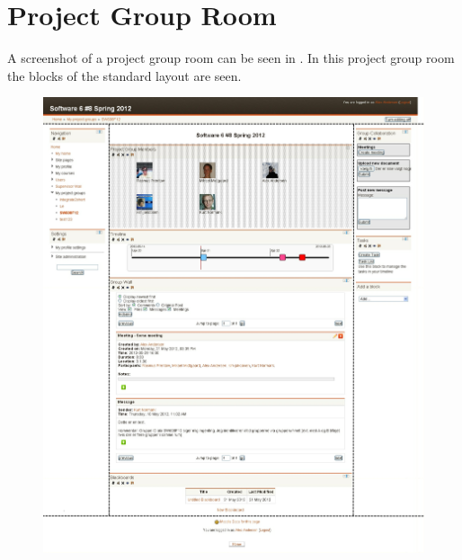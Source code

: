 \section{Project Group Room}
A screenshot of a project group room can be seen in . 
In this project group room the blocks of the standard layout are seen.
\begin{figure}[h]
	\centering
		\includegraphics[width=\textwidth]{images/projectgroupwithedit.png}
	\label{fig:projectgroupnoedit}
\end{figure}

